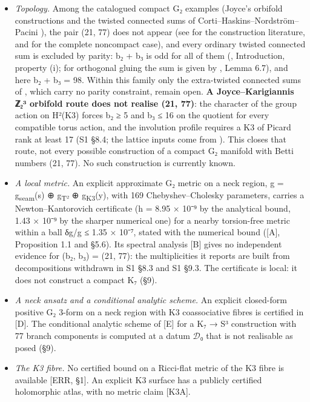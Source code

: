\documentclass[11pt,a4paper]{article}
\begin{document}
\begin{itemize}
\tightlist
\item
  \emph{Topology.} Among the catalogued compact G₂ examples (Joyce's orbifold constructions \cite{20} and the twisted connected sums of Corti--Haskins--Nordström--Pacini \cite{21,22}), the pair (21, 77) does not appear (see \cite{14,15} for the construction literature, and \cite{12} for the complete noncompact case), and every ordinary twisted connected sum is excluded by parity: b₂ + b₃ is odd for all of them (\cite{14}, Introduction, property (i); for orthogonal gluing the sum is given by \cite{22}, Lemma 6.7), and here b₂ + b₃ = 98. Within this family only the extra-twisted connected sums of \cite{14}, which carry no parity constraint, remain open. \textbf{A Joyce--Karigiannis ℤ₂³ orbifold route \cite{43} does not realise (21, 77)}: the character of the group action on H²(K3) forces b₂ ≥ 5 and b₃ ≤ 16 on the quotient for every compatible torus action, and the involution profile requires a K3 of Picard rank at least 17 (S1 §8.4; the lattice inputs come from \cite{44,45,51}). This closes that route, not every possible construction of a compact G₂ manifold with Betti numbers (21, 77). No such construction is currently known.
\item
  \emph{A local metric.} An explicit approximate G₂ metric on a neck region, g = g\textsubscript{seam}(s) ⊕ g\textsubscript{T²} ⊕ g\textsubscript{K3}(y), with 169 Chebyshev--Cholesky parameters, carries a Newton--Kantorovich certificate (h = 8.95 × 10⁻⁹ by the analytical bound, 1.43 × 10⁻⁹ by the sharper numerical one) for a nearby torsion-free metric within a ball δg/g ≤ 1.35 × 10⁻⁷, stated with the numerical bound ({[}A{]}, Proposition 1.1 and §5.6). Its spectral analysis {[}B{]} gives no independent evidence for (b₂, b₃) = (21, 77): the multiplicities it reports are built from decompositions withdrawn in S1 §8.3 and S1 §9.3. The certificate is local: it does not construct a compact K₇ (§9).
\item
  \emph{A neck ansatz and a conditional analytic scheme.} An explicit closed-form positive G₂ 3-form on a neck region with K3 coassociative fibres is certified in {[}D{]}. The conditional analytic scheme of {[}E{]} for a K₇ → S³ construction with 77 branch components is computed at a datum \ensuremath{\mathcal{D}}₀ that is not realisable as posed (§9).
\item
  \emph{The K3 fibre.} No certified bound on a Ricci-flat metric of the K3 fibre is available {[}ERR, §1{]}. An explicit K3 surface has a publicly certified holomorphic atlas, with no metric claim {[}K3A{]}.
\end{itemize}
\end{document}
